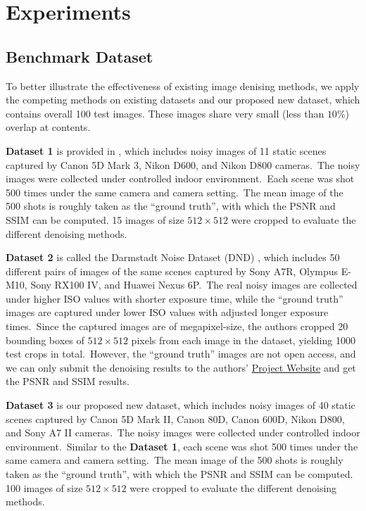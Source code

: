 \section{Experiments}

\subsection{Benchmark Dataset} 

To better illustrate the effectiveness of existing image denising methods, we apply the competing methods on existing datasets \cite{crosschannel2016,dnd2017} and our proposed new dataset, which contains overall 100 test images. These images share very small (less than $10\%$) overlap at contents.

\textbf{Dataset 1} is provided in \cite{crosschannel2016}, which includes noisy images of 11 static scenes captured by Canon 5D Mark 3, Nikon D600, and Nikon D800 cameras.\ The noisy images were collected under controlled indoor environment.\ Each scene was shot 500 times under the same camera and camera setting.\ The mean image of the 500 shots is roughly taken as the ``ground truth'', with which the PSNR and SSIM \cite{ssim} can be computed. 15 images of size $512\times512$ were cropped to evaluate the different denoising methods.  

\textbf{Dataset 2} is called the Darmstadt Noise Dataset (DND) \cite{dnd2017}, which includes 50 different pairs of images of the same scenes captured by Sony A7R, Olympus E-M10, Sony RX100 IV, and Huawei Nexus 6P.\ The real noisy images are collected under higher ISO values with shorter exposure time, while the ``ground truth'' images are captured under lower ISO values with adjusted longer exposure times.\ Since the captured images are of megapixel-size, the authors cropped 20 bounding boxes of $512\times512$ pixels from each image in the dataset, yielding 1000 test crops in total.\ However, the ``ground truth'' images are not open access, and we can only submit the denoising results to the authors' \href{https://noise.visinf.tu-darmstadt.de/}{Project Website} and get the PSNR and SSIM \cite{ssim} results.

\textbf{Dataset 3} is our proposed new dataset, which includes noisy images of 40 static scenes captured by Canon 5D Mark II, Canon 80D, Canon 600D, Nikon D800, and Sony A7 II cameras.\ The noisy images were collected under controlled indoor environment.\ Similar to the \textbf{Dataset 1}, each scene was shot 500 times under the same camera and camera setting.\ The mean image of the 500 shots is roughly taken as the ``ground truth'', with which the PSNR and SSIM \cite{ssim} can be computed. 100 images of size $512\times512$ were cropped to evaluate the different denoising methods.  

